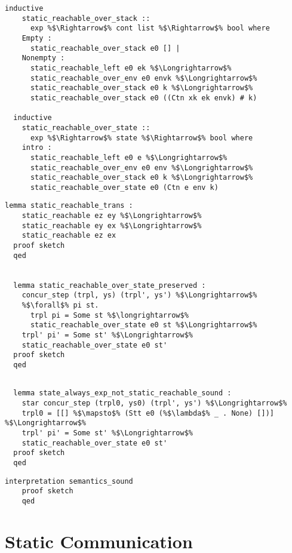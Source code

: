 \begin{lstlisting}[style=codestyle1, escapechar=\%]
  inductive
    static_reachable_over_stack ::
      exp %$\Rightarrow$% cont list %$\Rightarrow$% bool where
    Empty :
      static_reachable_over_stack e0 [] |
    Nonempty :
      static_reachable_left e0 ek %$\Longrightarrow$%
      static_reachable_over_env e0 envk %$\Longrightarrow$%
      static_reachable_over_stack e0 k %$\Longrightarrow$%
      static_reachable_over_stack e0 ((Ctn xk ek envk) # k)

  inductive
    static_reachable_over_state ::
      exp %$\Rightarrow$% state %$\Rightarrow$% bool where
    intro :
      static_reachable_left e0 e %$\Longrightarrow$%
      static_reachable_over_env e0 env %$\Longrightarrow$%
      static_reachable_over_stack e0 k %$\Longrightarrow$%
      static_reachable_over_state e0 (Ctn e env k)

  \end{lstlisting}

\begin{lstlisting}[style=codestyle1, escapechar=\%]
  lemma static_reachable_trans :
    static_reachable ez ey %$\Longrightarrow$%
    static_reachable ey ex %$\Longrightarrow$%
    static_reachable ez ex
  proof sketch 
  qed


  lemma static_reachable_over_state_preserved :
    concur_step (trpl, ys) (trpl', ys') %$\Longrightarrow$%
    %$\forall$% pi st.
      trpl pi = Some st %$\longrightarrow$%
      static_reachable_over_state e0 st %$\Longrightarrow$%
    trpl' pi' = Some st' %$\Longrightarrow$%
    static_reachable_over_state e0 st'
  proof sketch 
  qed
  \end{lstlisting}


\begin{lstlisting}[style=codestyle1, escapechar=\%]

  lemma state_always_exp_not_static_reachable_sound :
    star concur_step (trpl0, ys0) (trpl', ys') %$\Longrightarrow$%
    trpl0 = [[] %$\mapsto$% (Stt e0 (%$\lambda$% _ . None) [])] %$\Longrightarrow$%
    trpl' pi' = Some st' %$\Longrightarrow$%
    static_reachable_over_state e0 st'
  proof sketch
  qed

  \end{lstlisting}

\begin{lstlisting}[style=codestyle1, escapechar=\%]
    interpretation semantics_sound
    proof sketch
    qed
  \end{lstlisting}

\section{Static Communication}



